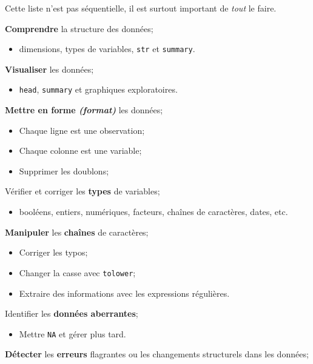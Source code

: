\documentclass[10pt, french]{article}
\begin{document}
\begin{multicols*}{3}
\begin{algo2}
Cette liste n'est pas séquentielle, il est surtout important de \textit{tout} le faire.
\begin{todolist}[leftmargin = *]
	\item	\textbf{Comprendre} la structure des données;
		\begin{itemize}[leftmargin = *]
		\item	dimensions, types de variables, \texttt{str} et \texttt{summary}.
		\end{itemize}
	\item	\textbf{Visualiser} les données;
		\begin{itemize}[leftmargin = *]
		\item	\texttt{head}, \texttt{summary} et graphiques exploratoires.
		\end{itemize}
	\item	\textbf{Mettre en forme \textit{(format)}} les données;
		\begin{itemize}[leftmargin = *]
		\item	Chaque ligne est une observation;
		\item	Chaque colonne est une variable;
		\item	Supprimer les doublons;
		\end{itemize}
	\item	Vérifier et corriger les \textbf{types} de variables;
		\begin{itemize}[leftmargin = *]
		\item	booléens, entiers, numériques, facteurs, chaînes de caractères, dates, etc.
		\end{itemize}
	\item	\textbf{Manipuler} les \textbf{chaînes} de caractères;
		\begin{itemize}[leftmargin = *]
		\item	Corriger les typos;
		\item	Changer la casse avec \texttt{tolower};
		\item	Extraire des informations avec les expressions régulières.
		\end{itemize}
	\item	Identifier les \textbf{données aberrantes};
		\begin{itemize}[leftmargin = *]
		\item	Mettre \texttt{NA} et gérer plus tard.
		\end{itemize}
	\item	\textbf{Détecter} les \textbf{erreurs} flagrantes ou les changements structurels dans les données;

\end{todolist}
\end{algo2}
\end{multicols*}
\end{document}
